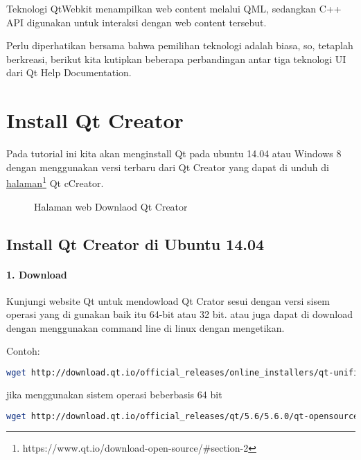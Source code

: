 Teknologi QtWebkit menampilkan web content melalui QML, sedangkan C++
API digunakan untuk interaksi dengan web content tersebut.

Perlu diperhatikan bersama bahwa pemilihan teknologi adalah biasa, so,
tetaplah berkreasi, berikut kita kutipkan beberapa perbandingan antar
tiga teknologi UI dari Qt Help Documentation.

\section{ Install Qt Creator}\label{install-qt-creator}

Pada tutorial ini kita akan menginstall Qt pada ubuntu 14.04 atau
Windows 8 dengan menggunakan versi terbaru dari Qt Creator yang dapat di
unduh di \href{http://www.qt.io/download}{halaman}\footnote{https://www.qt.io/download-open-source/\#section-2} Qt cCreator.

\begin{figure}[htbp]
\centering
{}
\label{halaman-web-download-qt}
\caption{Halaman web Downlaod Qt Creator}
\end{figure}

\subsection{Install Qt Creator di Ubuntu
14.04}\label{install-qt-creator-di-ubuntu-14.04}

\paragraph{1. Download}\label{download}

Kunjungi website Qt untuk mendowload Qt Crator sesui dengan versi sisem
operasi yang di gunakan baik itu 64-bit atau 32 bit. atau juga dapat di
download dengan menggunakan command line di linux dengan mengetikan.

Contoh:

\begin{lstlisting}[language=sh, numbers=none]
wget http://download.qt.io/official_releases/online_installers/qt-unified-linux-x86-online.run
\end{lstlisting}

jika menggunakan sistem operasi beberbasis 64 bit

\begin{lstlisting}[language=sh, numbers=none]
wget http://download.qt.io/official_releases/qt/5.6/5.6.0/qt-opensource-linux-x64-5.6.0.run
\end{lstlisting}

